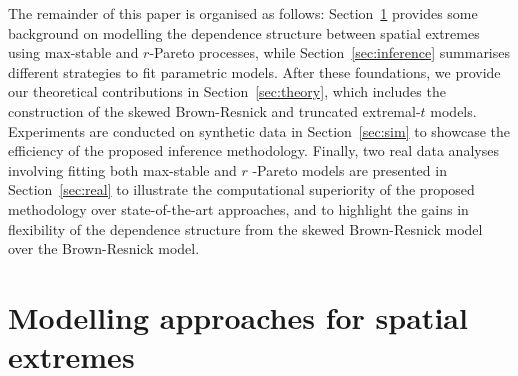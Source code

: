 \documentclass[12pt]{article}
\begin{document}
The remainder of this paper is organised as follows: Section~\ref{sec:modelling} provides some background on 
modelling the dependence structure between spatial extremes using max-stable and $r$-Pareto processes, while Section~\ref{sec:inference} summarises different strategies to fit parametric models. After these foundations,
we provide our theoretical contributions in Section~\ref{sec:theory}, which includes the construction of the skewed Brown-Resnick and truncated extremal-$t$ models. Experiments are conducted on synthetic data in Section~\ref{sec:sim} to showcase the efficiency of the proposed inference methodology. Finally, two real data analyses involving fitting both max-stable and $r$ -Pareto models are presented in Section~\ref{sec:real} to illustrate the computational superiority of the proposed methodology over state-of-the-art approaches, and to highlight the gains in flexibility of the dependence structure from the skewed Brown-Resnick model over the Brown-Resnick model.  


\section{Modelling approaches for spatial extremes}
\label{sec:modelling}


\end{document}
